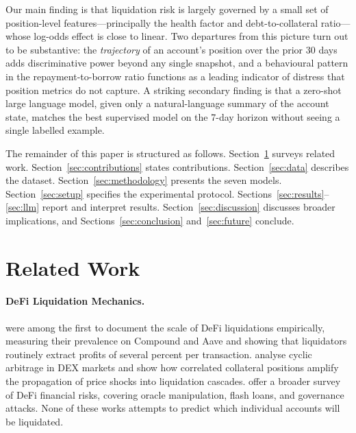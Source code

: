 \documentclass[12pt,a4paper]{article}
\begin{document}
Our main finding is that liquidation risk is largely governed by a small set
of position-level features---principally the health factor and
debt-to-collateral ratio---whose log-odds effect is close to linear.  Two
departures from this picture turn out to be substantive: the
\emph{trajectory} of an account's position over the prior 30 days adds
discriminative power beyond any single snapshot, and a behavioural pattern
in the repayment-to-borrow ratio functions as a leading indicator of distress
that position metrics do not capture.  A striking secondary finding is that
a zero-shot large language model, given only a natural-language summary of the
account state, matches the best supervised model on the 7-day horizon without
seeing a single labelled example.

The remainder of this paper is structured as follows.
Section~\ref{sec:related} surveys related work.
Section~\ref{sec:contributions} states contributions.
Section~\ref{sec:data} describes the dataset.
Section~\ref{sec:methodology} presents the seven models.
Section~\ref{sec:setup} specifies the experimental protocol.
Sections~\ref{sec:results}--\ref{sec:llm} report and interpret results.
Section~\ref{sec:discussion} discusses broader implications, and
Sections~\ref{sec:conclusion} and~\ref{sec:future} conclude.


\section{Related Work}
\label{sec:related}

\paragraph{DeFi Liquidation Mechanics.}
\citet{qin2021liquidations} were among the first to document the scale of
DeFi liquidations empirically, measuring their prevalence on Compound and
Aave and showing that liquidators routinely extract profits of several
percent per transaction.  \citet{wang2022cyclic} analyse cyclic arbitrage in
DEX markets and show how correlated collateral positions amplify the
propagation of price shocks into liquidation cascades.
\citet{xu2022sok} offer a broader survey of DeFi financial risks, covering
oracle manipulation, flash loans, and governance attacks.  None of these
works attempts to predict which individual accounts will be liquidated.
\end{document}
